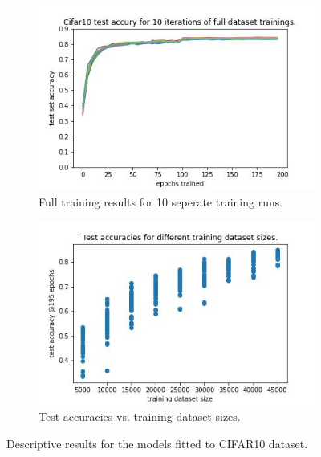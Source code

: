 \documentclass{article} %
\begin{document}
\begin{figure}
    \begin{subfigure}{.5\textwidth}
        \centering
        \includegraphics[width=.8\linewidth]{cifar10/Cifar10_full_dataset_acc_vs_epoch.jpg}
        \caption{Full training results for 10 seperate training runs.}
        \label{fig_full_dataset_epoch_vs_acc_cifar}
    \end{subfigure}%
    \begin{subfigure}{.5\textwidth}
        \centering
        \includegraphics[width=.8\linewidth]{cifar10/Cifar10_training_datasetsize_vs_test_acc.jpg}
        \caption{Test accuracies vs. training dataset sizes.}
        \label{fig_traing_subset_size_vs_test_acc_cifar}
    \end{subfigure}

    \caption{Descriptive results for the models fitted to CIFAR10 dataset.}
    \label{fig:desc_plots_cifar10}
\end{figure}
\end{document}
